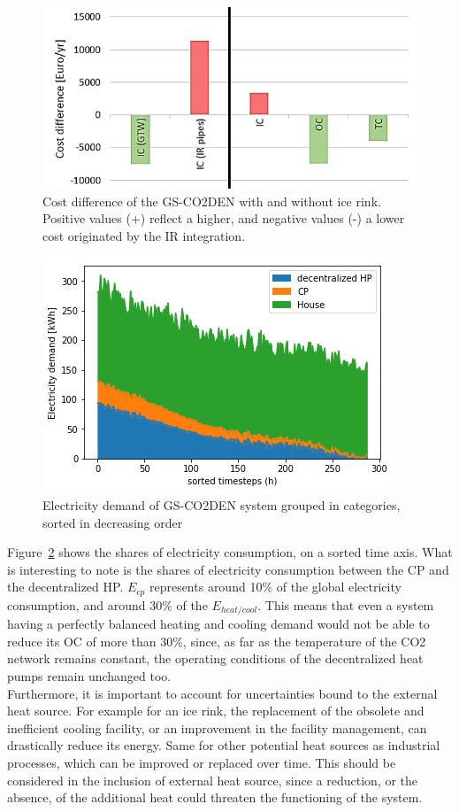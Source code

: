 \documentclass{article}
\begin{document}
\begin{figure}[tph]
	\centering
	\includegraphics[width=0.7\linewidth]{Images/V_IR_cost}
	\caption{Cost difference of the GS-CO2DEN with and without ice rink. Positive values (+) reflect a higher, and negative values (-) a lower cost originated by the IR integration.}
	\label{fig:V_IR_cost}
\end{figure}


\begin{figure}[tph]
	\centering
	\includegraphics[width=0.7\linewidth]{Images/V_CO2_eldem_sorted}
	\caption{Electricity demand of GS-CO2DEN system grouped in categories, sorted in decreasing order}
	\label{fig:gsco2_el}
\end{figure}

Figure~\ref{fig:gsco2_el} shows the shares of electricity consumption, on a sorted time axis. What is interesting to note is the shares of electricity consumption between the CP and the decentralized HP. $E_{cp}$ represents around 10\% of the global electricity consumption, and around 30\% of the $E_{heat/cool}$. This means that even a system having a perfectly balanced heating and cooling demand would not be able to reduce its OC of more than 30\%, since, as far as the temperature of the CO2 network remains constant, the operating conditions of the decentralized heat pumps remain unchanged too.\\

Furthermore, it is important to account for uncertainties bound to the external heat source. For example for an ice rink, the replacement of the obsolete and inefficient cooling facility, or an improvement in the facility management, can drastically reduce its energy. Same for other potential heat sources as industrial processes, which can be improved or replaced over time. This should be considered in the inclusion of external heat source, since a reduction, or the absence, of the additional heat could threaten the functioning of the system.
\end{document}
